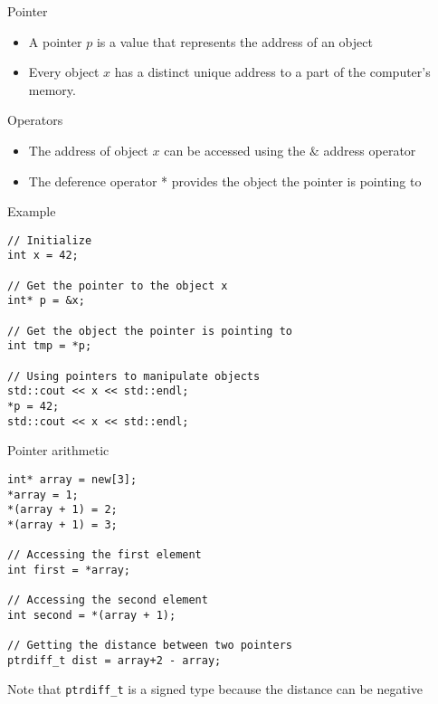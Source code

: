 \documentclass[12pt,t]{beamer}
\begin{document}
\begin{frame}{Pointer}

\begin{center}

\end{center}
\begin{itemize}
\item A pointer $p$ is a value that represents the address of an object
\item Every object $x$ has a distinct unique address to a part of the computer's memory.
\end{itemize}

\begin{block}{Operators}
\begin{itemize}
\item The address of object $x$ can be accessed using the $\&$ address operator 
\item The deference operator * provides the object the pointer is pointing to
\end{itemize}
\end{block}

\end{frame}

\begin{frame}[fragile]{Example}

\begin{lstlisting}
// Initialize
int x = 42;

// Get the pointer to the object x
int* p = &x;

// Get the object the pointer is pointing to
int tmp = *p;

// Using pointers to manipulate objects
std::cout << x << std::endl;
*p = 42;
std::cout << x << std::endl;

\end{lstlisting}

\end{frame}

\begin{frame}[fragile]{Pointer arithmetic}

\begin{lstlisting}
int* array = new[3];
*array = 1;
*(array + 1) = 2;
*(array + 1) = 3;

// Accessing the first element
int first = *array;

// Accessing the second element
int second = *(array + 1);

// Getting the distance between two pointers
ptrdiff_t dist = array+2 - array;
\end{lstlisting}

Note that \lstinline|ptrdiff_t| is a signed type because the distance can be negative
\end{frame}
\end{document}
